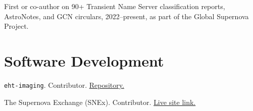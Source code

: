 \documentclass[margin,line]{res}
\begin{document}
\begin{resume}
\vspace{-2mm}
First or co-author on 90+ Transient Name Server classification reports, AstroNotes, and GCN circulars, 2022--present, as part of the Global Supernova Project.

\vspace{+.2cm}
\section{\sc Software Development}

\texttt{eht-imaging}. Contributor. {\color{blue}\href{https://github.com/achael/eht-imaging}{Repository.}}

\vspace*{-2mm}
The Supernova Exchange (SNEx). Contributor. {\color{blue}\href{https://supernova.exchange}{Live site link.}}




\end{resume}
\end{document}
